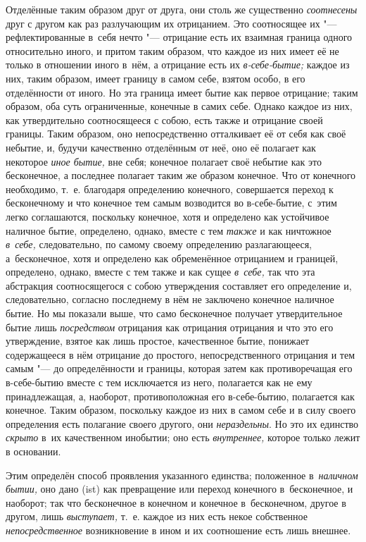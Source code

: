 Отделённые таким образом друг от друга, они столь же существенно
{\em соотнесены} друг с другом как раз разлучающим их отрицанием. Это
соотносящее их "--- рефлектированные в~себя нечто "--- отрицание есть их
взаимная граница одного относительно иного, и притом таким образом, что каждое
из них имеет её не только в отношении иного в~нём, а отрицание есть их
{\em в-себе-бытие;} каждое из них, таким образом, имеет границу в самом себе,
взятом особо, в его отделённости от иного. Но эта граница имеет бытие как
первое отрицание; таким образом, оба суть ограниченные, конечные в самих себе.
Однако каждое из них, как утвердительно соотносящееся с собою, есть также и
отрицание своей границы. Таким образом, оно непосредственно отталкивает её от
себя как своё небытие, и, будучи качественно отделённым от неё, оно её полагает
как некоторое {\em иное бытие,} вне себя; конечное полагает своё небытие как
это бесконечное, а последнее полагает таким же образом конечное. Что от
конечного необходимо, т.~е. благодаря определению конечного, совершается
переход к бесконечному и что конечное тем самым возводится во в-себе-бытие,
с~этим легко соглашаются, поскольку конечное, хотя и определено как устойчивое
наличное бытие, определено, однако, вместе с тем {\em также} и как ничтожное
{\em в~себе,} следовательно, по самому своему определению разлагающееся,
а~бесконечное, хотя и определено как обременённое отрицанием и границей,
определено, однако, вместе с тем также и как сущее {\em в~себе,} так что эта
абстракция соотносящегося с собою утверждения составляет его определение и,
следовательно, согласно последнему в нём не заключено конечное наличное бытие.
Но мы показали выше, что само бесконечное получает утвердительное бытие лишь
{\em посредством} отрицания как отрицания отрицания и что это его утверждение,
взятое как лишь простое, качественное бытие, понижает содержащееся в нём
отрицание до простого, непосредственного отрицания и тем самым "--- до
определённости и границы, которая затем как противоречащая его в-себе-бытию
вместе с тем исключается из него, полагается как не ему принадлежащая, а,
наоборот, противоположная его в-себе-бытию, полагается как конечное. Таким
образом, поскольку каждое из них в самом себе и в силу своего определения есть
полагание своего другого, они {\em нераздельны}. Но это их единство
{\em скрыто} в~их качественном инобытии; оно есть {\em внутреннее,} которое
только лежит в основании.

Этим определён способ проявления указанного единства; положенное
в~{\em наличном бытии,} оно дано (ist) как превращение или переход конечного
в~бесконечное, и наоборот; так что бесконечное в конечном и конечное
в~бесконечном, другое в другом, лишь {\em выступает,} т.~е. каждое из них есть
некое собственное {\em непосредственное} возникновение в ином и их соотношение
есть лишь внешнее.

